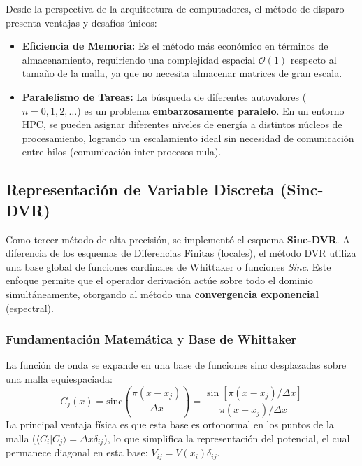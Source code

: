 \documentclass[11pt,fleqn]{article}
\begin{document}
Desde la perspectiva de la arquitectura de computadores, el método de disparo presenta ventajas y desafíos únicos:
\begin{itemize}
    \item \textbf{Eficiencia de Memoria:} Es el método más económico en términos de almacenamiento, requiriendo una complejidad espacial $\mathcal{O}(1)$ respecto al tamaño de la malla, ya que no necesita almacenar matrices de gran escala.
    \item \textbf{Paralelismo de Tareas:} La búsqueda de diferentes autovalores ($n=0, 1, 2, \dots$) es un problema \textbf{embarzosamente paralelo}. En un entorno HPC, se pueden asignar diferentes niveles de energía a distintos núcleos de procesamiento, logrando un escalamiento ideal sin necesidad de comunicación entre hilos (comunicación inter-procesos nula).
\end{itemize}



\subsection{Representación de Variable Discreta (Sinc-DVR)}

Como tercer método de alta precisión, se implementó el esquema \textbf{Sinc-DVR}. A diferencia de los esquemas de Diferencias Finitas (locales), el método DVR utiliza una base global de funciones cardinales de Whittaker o funciones \textit{Sinc}. Este enfoque permite que el operador derivación actúe sobre todo el dominio simultáneamente, otorgando al método una \textbf{convergencia exponencial} (espectral).

\subsubsection{Fundamentación Matemática y Base de Whittaker}

La función de onda se expande en una base de funciones sinc desplazadas sobre una malla equiespaciada:
\begin{equation}
    C_j(x) = \text{sinc}\left( \frac{\pi(x-x_j)}{\Delta x} \right) = \frac{\sin[\pi(x-x_j)/\Delta x]}{\pi(x-x_j)/\Delta x}
\end{equation}
La principal ventaja física es que esta base es ortonormal en los puntos de la malla ($\langle C_i | C_j \rangle = \Delta x \delta_{ij}$), lo que simplifica la representación del potencial, el cual permanece diagonal en esta base: $V_{ij} = V(x_i)\delta_{ij}$.
\end{document}
